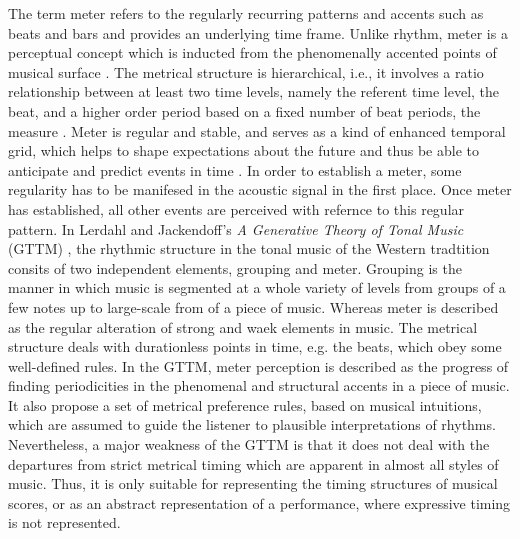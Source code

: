 \documentclass{scrartcl}
\begin{document}
The term meter refers to the regularly recurring patterns and accents such as beats and bars and provides an underlying time frame. Unlike rhythm, meter is a perceptual concept which is inducted from the phenomenally accented points of musical surface \cite{London2004}. The metrical structure is hierarchical, i.e., it involves a ratio relationship between at least two time levels, namely the referent time level, the beat, and a higher order period based on a fixed number of beat periods, the measure \cite{Yeston1976}. Meter is regular and stable, and serves as a kind of enhanced temporal grid, which helps to shape expectations about the future and thus be able to anticipate and predict events in time \cite{Huron2006}. In order to establish a meter, some regularity has to be manifesed in the acoustic signal in the first place. Once meter has established, all other events are perceived with refernce to this regular pattern.  In Lerdahl and Jackendoff's \emph{A Generative Theory of Tonal Music} (GTTM) \cite{Lerdahl1985}, the rhythmic structure in the tonal music of the Western tradtition consits of two independent elements, grouping and meter. Grouping is the manner in which music is segmented at a whole variety of levels from groups of a few notes up to large-scale from of a piece of music. Whereas meter is described as the regular alteration of strong and waek elements in music. The metrical structure deals with durationless points in time, e.g. the beats, which obey some well-defined rules. In the GTTM, meter perception is described as the progress of finding periodicities in the phenomenal and structural accents in a piece of music. It also propose a set of metrical preference rules, based on musical intuitions, which are assumed to guide the listener to plausible interpretations of rhythms. Nevertheless, a major weakness of the GTTM is that it does not deal with the departures from strict metrical timing which are apparent in almost all styles of music. Thus, it is only suitable for representing the timing structures of musical scores, or as an abstract representation of a performance, where expressive timing is not represented.



\end{document}
